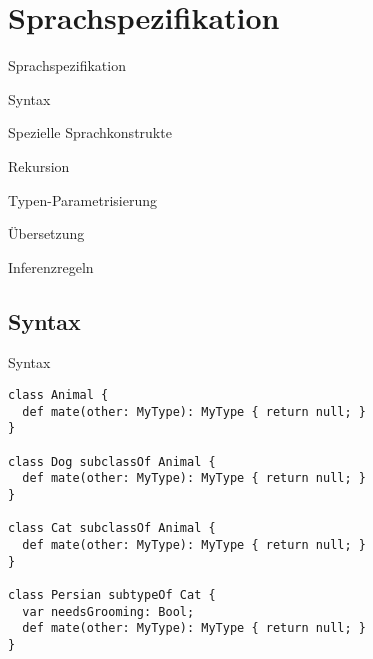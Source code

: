 \section{Sprachspezifikation}
\begin{frame}[t]{Sprachspezifikation}

	\begin{bigitemize}{3mm}
		\item Syntax
		\item Spezielle Sprachkonstrukte
		\item Rekursion
		\item Typen-Parametrisierung
		\item Übersetzung
		\item Inferenzregeln
	\end{bigitemize}
\end{frame}

\subsection{Syntax}
\begin{frame}[fragile]{Syntax}
\begin{lstlisting}[language=ooplss]
class Animal {
  def mate(other: MyType): MyType { return null; }
}

class Dog subclassOf Animal {
  def mate(other: MyType): MyType { return null; }
}

class Cat subclassOf Animal {
  def mate(other: MyType): MyType { return null; }
}

class Persian subtypeOf Cat {
  var needsGrooming: Bool;
  def mate(other: MyType): MyType { return null; }
}
\end{lstlisting}
\end{frame}

